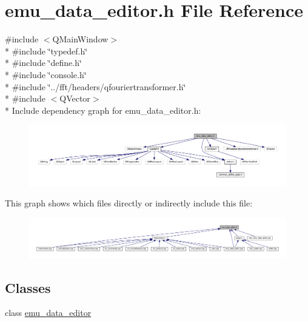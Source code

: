 \hypertarget{a00036}{\section{emu\+\_\+data\+\_\+editor.\+h File Reference}
\label{a00036}
}
{\ttfamily \#include $<$Q\+Main\+Window$>$}\\*
{\ttfamily \#include \char`\"{}typedef.\+h\char`\"{}}\\*
{\ttfamily \#include \char`\"{}define.\+h\char`\"{}}\\*
{\ttfamily \#include \char`\"{}console.\+h\char`\"{}}\\*
{\ttfamily \#include \char`\"{}../fft/headers/qfouriertransformer.\+h\char`\"{}}\\*
{\ttfamily \#include $<$Q\+Vector$>$}\\*
Include dependency graph for emu\+\_\+data\+\_\+editor.\+h\+:
\nopagebreak
\begin{figure}[H]
\begin{center}
\leavevmode
\includegraphics[width=350pt]{da/d01/a00153}
\end{center}
\end{figure}
This graph shows which files directly or indirectly include this file\+:
\nopagebreak
\begin{figure}[H]
\begin{center}
\leavevmode
\includegraphics[width=350pt]{d3/d65/a00154}
\end{center}
\end{figure}
\subsection*{Classes}
\begin{DoxyCompactItemize}
\item 
class \hyperlink{a00004}{emu\+\_\+data\+\_\+editor}
\end{DoxyCompactItemize}
